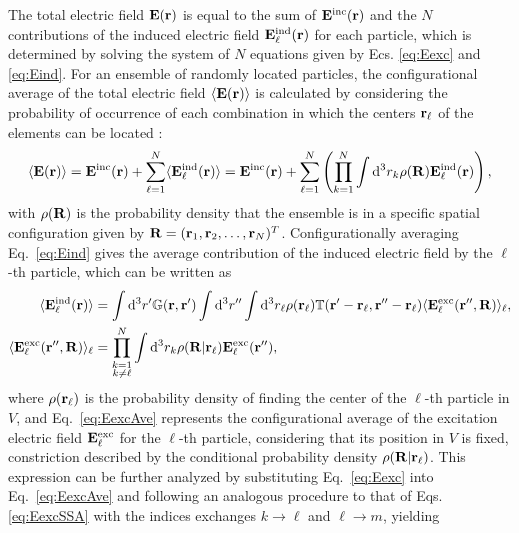 The total electric field $\vb{E}(\vb{r})$ is equal to the sum of $\vb{E}^\text{inc}(\vb{r})$ and the $N$ contributions of the induced electric field $\vb{E}^\text{ind}_\ell(\vb{r})$ for each particle, which is determined by solving the system of $N$ equations given by Ecs. \eqref{eq:Eexc} and \eqref{eq:Eind}. For an ensemble of randomly located particles, the configurational average of the total electric field $\langle\vb{E}(\vb{r})\rangle$ is calculated by considering the probability of occurrence of each combination in which the centers $\vb{r}_\ell$ of the elements can be located \cite{garcia2012multiple,barrera_coherent_2003}:
%
\begin{align}
	\langle\vb{E}(\vb{r})\rangle =
	\vb{E}^\text{inc}(\vb{r}) + \sum_{\ell = 1}^N \langle  \vb{E}^\text{ind}_\ell  (\vb{r})\rangle
	= \vb{E}^\text{inc}(\vb{r}) +  \sum_{\ell = 1}^N  \left(\prod_{k = 1}^N \int\dd^3 r_k \rho(\vb{R}) \vb{E}^\text{ind}_\ell(\vb{r})\right),
	\label{eq:Eave}
\end{align}
%
with $\rho(\vb{R})$ is the probability density that the ensemble is in a specific spatial configuration given by $\vb{R} = (\vb{r}_1,\vb{r}_2,\ldots,\vb{r}_N)^T$. Configurationally averaging Eq.~\eqref{eq:Eind} gives the average contribution of the induced electric field by the $\ell$-th particle, which can be written as \cite{barrera_coherent_2003,garcia2012multiple}
%
\begin{subequations}%
	\begin{align}%
		\langle \vb{E}^\text{ind}_\ell(\vb{r}) \rangle &= \int\dd^3 r'\mathbb{G}(\vb{r},\vb{r}')
		\int\dd^3 r'' \int \dd^3 r_\ell \rho(\vb{r}_\ell) \mathbb{T}(\vb{r}'-\vb{r}_\ell,\vb{r}''-\vb{r}_\ell)
		\langle \vb{E}_\ell^\text{exc}(\vb{r}'',\vb{R})\rangle_\ell,%
		\\
		\langle \vb{E}_\ell^\text{exc}(\vb{r}'',\vb{R})\rangle_\ell
		&= \prod_{\substack{k =1 \\ k\neq \ell}}^N  \int\dd^3 r_k \rho(\vb{R}|\vb{r}_\ell) \vb{E}^\text{exc}_\ell(\vb{r}''),
		\label{eq:EexcAve}
	\end{align}%
	\label{eq:EexcSSA}%
\end{subequations}%
%
where $\rho(\vb{r}_\ell)$ is the probability density of finding the center of the $\ell$-th particle in $V$, and Eq.~\eqref{eq:EexcAve} represents the configurational average of the excitation electric field $\vb{E}_\ell^\text{exc}$ for the $\ell$-th particle, considering that its position in $V$ is fixed, constriction described by the conditional probability density $\rho(\vb{R}|\vb{r}_\ell)$. This expression can be further analyzed by substituting Eq.~\eqref{eq:Eexc} into Eq.~\eqref{eq:EexcAve} and following an analogous procedure to that of Eqs. \eqref{eq:EexcSSA} with the indices exchanges $k\to\ell$ and $\ell \to m$, yielding

